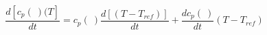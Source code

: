 \begin{equation}
\frac{d [c_p(\ ) (T]}{dt} =c_p(\ ) \frac{d [ (T- T_{ref})]}{dt} + \frac{d c_p(\ )}{dt} (T- T_{ref})
\end{equation}